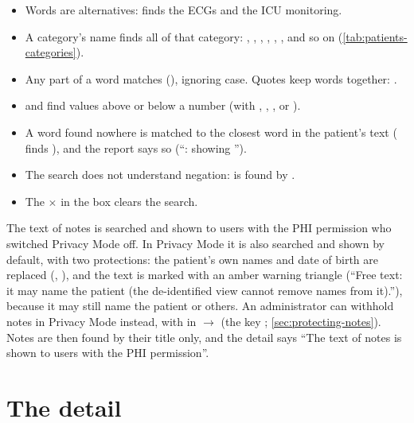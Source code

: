 \begin{itemize}
\item Words are alternatives:  finds the ECGs and the ICU monitoring.
\item A category's name finds all of that category: , , ,
  , , ,  and so on
  (\cref{tab:patients-categories}).
\item Any part of a word matches (), ignoring case. Quotes keep words together:
  .
\item {} and  find values above or below a number (with \code{>},
  \code{<}, \code{>=}, \code{<=} or \code{=}).
\item A word found nowhere is matched to the closest word in the patient's text
  ( finds ), and the report says so (``: showing
  '').
\item The search does not understand negation:  is found by
  .
\item The $\times$ in the box clears the search.
\end{itemize}

\begin{phibox}
The text of notes is searched and shown to users with the PHI permission who switched Privacy
Mode off. In Privacy Mode it is also searched and shown by default, with two protections: the
patient's own names and date of birth are replaced (, ), and the text is marked with an amber warning triangle (``Free text: it may name the
patient (the de-identified view cannot remove names from it).''), because it may still name the
patient or others. An administrator can withhold notes in Privacy Mode instead, with  in  $\rightarrow$  (the key ;
\cref{sec:protecting-notes}). Notes are then found by their title only, and the detail says
``The text of notes is shown to users with the PHI permission''.
\end{phibox}

\section{The detail}
\label{sec:patients-detail}

